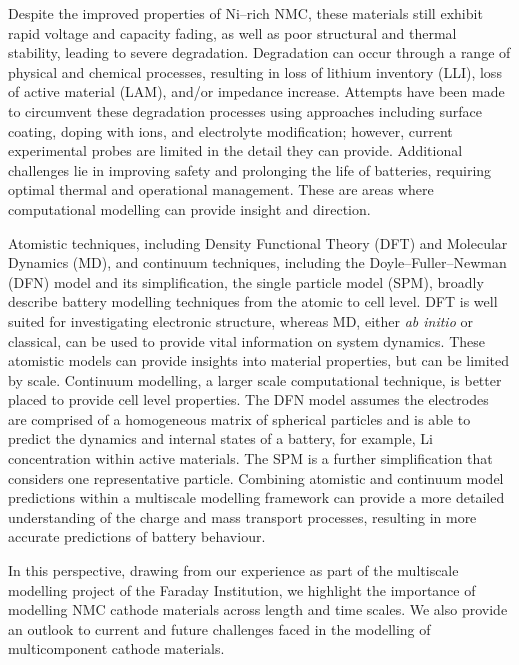 \documentclass[journal=jacsat,manuscript=article]{achemso}
\begin{document}
Despite the improved properties of Ni--rich NMC, these materials still exhibit rapid voltage and capacity fading, as well as poor structural and thermal stability,\cite{noh2013comparison,Li-aenm-2019,Jerng-ACS-AMI-2020} leading to severe degradation.\cite{Zhang-acs.chemmater-2019,duan2019insights,Xia2018,De-AdMat-2019,Li_Nat-Comm-2017,Manthiram-NatComm-2020}
Degradation can occur through a range of physical and chemical processes, resulting in loss of lithium inventory (LLI), loss of active material (LAM), and/or impedance increase.\cite{vetter2005ageing} 
Attempts have been made to circumvent these degradation processes using approaches including surface coating, doping with ions, and electrolyte modification;\cite{Sari2019,Liu-JSSE-2020} however, current experimental probes are limited in the detail they can provide. 
Additional challenges lie in improving safety and prolonging the life of batteries, requiring optimal thermal and operational management. 
These are areas where computational modelling can provide insight and direction.

Atomistic techniques, including Density Functional Theory (DFT) and Molecular Dynamics (MD), and continuum techniques, including the Doyle--Fuller--Newman (DFN) model and its simplification, the single particle model (SPM),\cite{Newman1975porous,Doyle1993DFN} broadly describe battery modelling techniques from the atomic to cell level.\cite{Howey_2020} 
DFT is well suited for investigating electronic structure, whereas MD, either \textit{ab initio} or classical, can be used to provide vital information on system dynamics.
These atomistic models can provide insights into material properties, but can be limited by scale. 
Continuum modelling, a larger scale computational technique, is better placed to provide cell level properties.
The DFN model assumes the electrodes are comprised of a homogeneous matrix of spherical particles and is able to predict the dynamics and internal states of a battery, for example, Li concentration within active materials.
The SPM is a further simplification that considers one representative particle.
Combining atomistic and continuum model predictions within a multiscale modelling framework can provide a more detailed understanding of the charge and mass transport processes, resulting in more accurate predictions of battery behaviour.

In this perspective, drawing from our experience as part of the multiscale modelling project of the Faraday Institution, we highlight the importance of modelling NMC cathode materials across length and time scales.
We also provide an outlook to current and future challenges faced in the modelling of multicomponent cathode materials.
\end{document}
